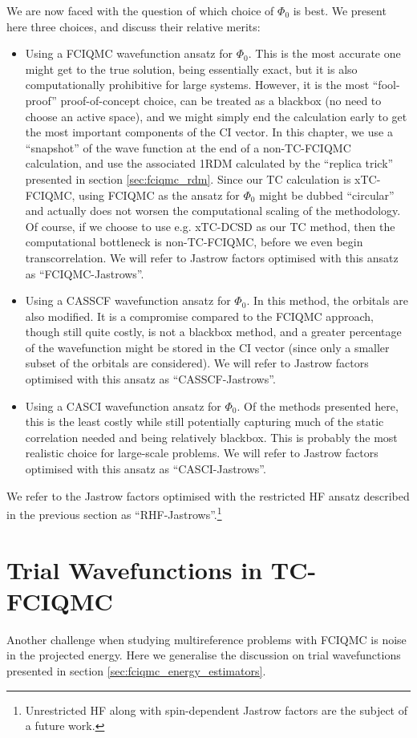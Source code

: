 We are now faced with the question of which choice of $\Phi_0$ is best. We present here three choices, and discuss their relative merits:
\begin{itemize}
    \item Using a FCIQMC wavefunction ansatz for $\Phi_0$. This is the most accurate one might get to the true solution, being essentially exact, but it is also computationally prohibitive for large systems. However, it is the most ``fool-proof'' proof-of-concept choice, can be treated as a blackbox (no need to choose an active space), and we might simply end the calculation early to get the most important components of the CI vector. In this chapter, we use a ``snapshot'' of the wave function at the end of a non-TC-FCIQMC calculation, and use the associated 1RDM calculated by the ``replica trick'' presented in section \ref{sec:fciqmc_rdm}. Since our TC calculation is xTC-FCIQMC, using FCIQMC as the ansatz for $\Phi_0$ might be dubbed ``circular'' and actually does not worsen the computational scaling of the methodology. Of course, if we choose to use e.g. xTC-DCSD as our TC method, then the computational bottleneck is non-TC-FCIQMC, before we even begin transcorrelation. We will refer to Jastrow factors optimised with this ansatz as ``FCIQMC-Jastrows''.
    \item Using a CASSCF wavefunction ansatz for $\Phi_0$. In this method, the orbitals are also modified. It is a compromise compared to the FCIQMC approach, though still quite costly, is not a blackbox method, and a greater percentage of the wavefunction might be stored in the CI vector (since only a smaller subset of the orbitals are considered). We will refer to Jastrow factors optimised with this ansatz as ``CASSCF-Jastrows''.
    \item Using a CASCI wavefunction ansatz for $\Phi_0$. Of the methods presented here, this is the least costly while still potentially capturing much of the static correlation needed and being relatively blackbox.\supercite{levineCAS2021} This is probably the most realistic choice for large-scale problems. We will refer to Jastrow factors optimised with this ansatz as ``CASCI-Jastrows''.
\end{itemize}
We refer to the Jastrow factors optimised with the restricted HF ansatz described in the previous section as ``RHF-Jastrows''.\footnote{Unrestricted HF along with spin-dependent Jastrow factors are the subject of a future work.}

\section{Trial Wavefunctions in TC-FCIQMC}
\begingroup
\def\trial {\Phi_\mathrm{trial}}
\def\evec {\Phi_\mathrm{FCIQMC}}
Another challenge when studying multireference problems with FCIQMC is noise in the projected energy. Here we generalise the discussion on trial wavefunctions presented in section \ref{sec:fciqmc_energy_estimators}.

